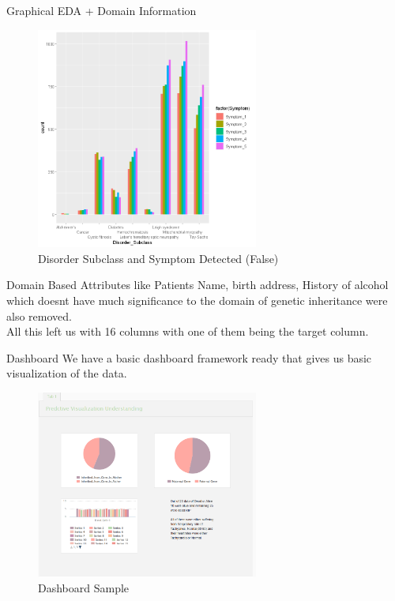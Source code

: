 \documentclass{beamer}
\begin{document}
\begin{frame}{Graphical EDA + Domain Information}
	
	\begin{figure}
		\includegraphics[width=0.65\textwidth, height=0.6\textheight]{s0.png}
		\caption{Disorder Subclass and Symptom Detected (False)}
	\end{figure}
\end{frame}
\begin{frame}{Domain Based}
	Attributes like Patients Name, birth address, History of alcohol which doesnt have much significance to the domain of genetic inheritance were also removed.\\
	All this left us with 16 columns with one of them being the target column.
\end{frame}
	\begin{frame}{Dashboard}
		We have a basic dashboard framework ready that  gives us basic visualization of the data.
			\begin{figure}
			\includegraphics[width=0.65\textwidth, height=0.6\textheight]{dash.png}
			\caption{Dashboard Sample}
		\end{figure}
	\end{frame}
	
\end{document}
